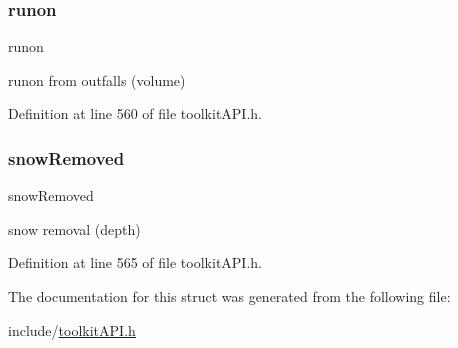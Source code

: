 \mbox{\label{struct_s_m___runoff_totals_ac05f157303936535978c7e69f6dfb16f}} 
\subsubsection{\texorpdfstring{runon}{runon}}
{\footnotesize\ttfamily runon}

runon from outfalls (volume) 

Definition at line 560 of file toolkit\+A\+P\+I.\+h.

\mbox{\label{struct_s_m___runoff_totals_ad3b23dfe7238169f9f3a0530fba2ba39}} 
\subsubsection{\texorpdfstring{snowRemoved}{snowRemoved}}
{\footnotesize\ttfamily snow\+Removed}

snow removal (depth) 

Definition at line 565 of file toolkit\+A\+P\+I.\+h.



The documentation for this struct was generated from the following file\+:\begin{DoxyCompactItemize}
\item 
include/\mbox{\hyperlink{toolkit_a_p_i_8h}{toolkit\+A\+P\+I.\+h}}\end{DoxyCompactItemize}
